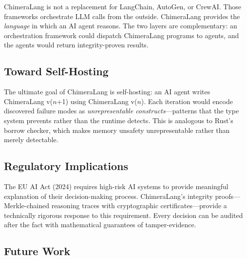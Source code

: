 \documentclass[11pt,a4paper]{article}
\begin{document}
ChimeraLang is not a replacement for LangChain, AutoGen, or CrewAI. Those
frameworks orchestrate LLM calls from the outside. ChimeraLang provides the
\emph{language} in which an AI agent reasons. The two layers are complementary:
an orchestration framework could dispatch ChimeraLang programs to agents, and
the agents would return integrity-proven results.

\subsection{Toward Self-Hosting}

The ultimate goal of ChimeraLang is self-hosting: an AI agent writes
ChimeraLang v($n$+1) using ChimeraLang v($n$). Each iteration would encode
discovered failure modes as \emph{unrepresentable constructs}---patterns that
the type system prevents rather than the runtime detects. This is analogous to
Rust's borrow checker, which makes memory unsafety unrepresentable rather than
merely detectable.

\subsection{Regulatory Implications}

The EU AI Act (2024) requires high-risk AI systems to provide meaningful
explanation of their decision-making process. ChimeraLang's integrity proofs---
Merkle-chained reasoning traces with cryptographic certificates---provide a
technically rigorous response to this requirement. Every decision can be audited
after the fact with mathematical guarantees of tamper-evidence.

\subsection{Future Work}
\end{document}
